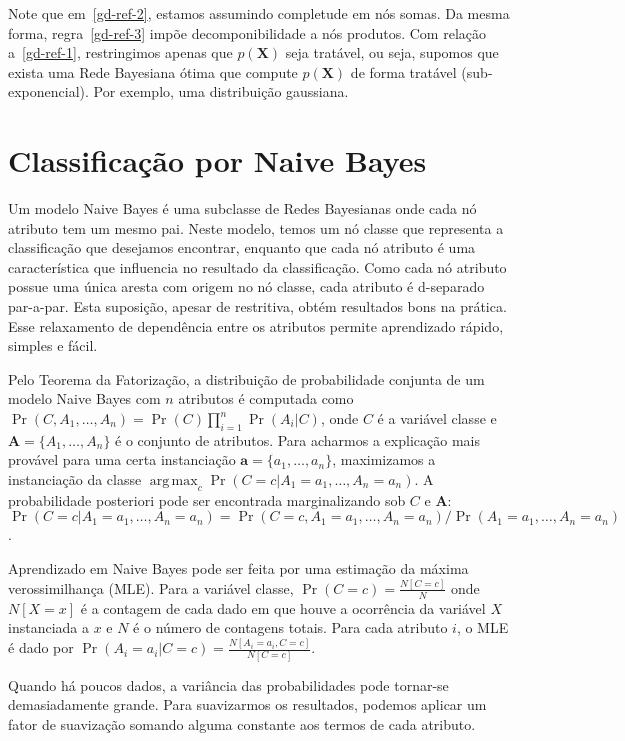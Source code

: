 \documentclass{amsart}
\DeclareMathOperator*{\argmax}{arg\,max}
\theoremstyle{plain}
\numberwithin{equation}{section}
\newcommand{\set}[1]{\mathbf{#1}}
\begin{document}
Note que em~\ref{gd-ref-2}, estamos assumindo completude em nós somas. Da mesma forma,
regra~\ref{gd-ref-3} impõe decomponibilidade a nós produtos. Com relação a~\ref{gd-ref-1},
restringimos apenas que $p(\set{X})$ seja tratável, ou seja, supomos que exista uma Rede Bayesiana
ótima que compute $p(\set{X})$ de forma tratável (sub-exponencial). Por exemplo, uma distribuição
gaussiana.

\section{Classificação por Naive Bayes}

Um modelo Naive Bayes é uma subclasse de Redes Bayesianas onde cada nó atributo tem um mesmo pai.
Neste modelo, temos um nó classe que representa a classificação que desejamos encontrar, enquanto
que cada nó atributo é uma característica que influencia no resultado da classificação. Como cada
nó atributo possue uma única aresta com origem no nó classe, cada atributo é d-separado par-a-par.
Esta suposição, apesar de restritiva, obtém resultados bons na prática. Esse relaxamento de
dependência entre os atributos permite aprendizado rápido, simples e fácil.

Pelo Teorema da Fatorização, a distribuição de probabilidade conjunta de um modelo Naive Bayes com
$n$ atributos é computada como $\Pr(C,A_1,\ldots,A_n)=\Pr(C)\prod_{i=1}^n \Pr(A_i|C)$, onde $C$ é
a variável classe e $\set{A}=\{A_1,\ldots,A_n\}$ é o conjunto de atributos. Para acharmos a
explicação mais provável para uma certa instanciação $\set{a}=\{a_1,\ldots,a_n\}$, maximizamos a
instanciação da classe $\argmax_c \Pr(C=c|A_1=a_1,\ldots,A_n=a_n)$. A probabilidade posteriori
pode ser encontrada marginalizando sob $C$ e $\set{A}$: $\Pr(C=c|A_1=a_1,\ldots,A_n=a_n)=\Pr(C=c,
A_1=a_1,\ldots,A_n=a_n)/\Pr(A_1=a_1,\ldots,A_n=a_n)$.

Aprendizado em Naive Bayes pode ser feita por uma estimação da máxima verossimilhança (MLE). Para a
variável classe, $\Pr(C=c)=\frac{N[C=c]}{N}$ onde $N[X=x]$ é a contagem de cada dado em que houve
a ocorrência da variável $X$ instanciada a $x$ e $N$ é o número de contagens totais. Para cada
atributo $i$, o MLE é dado por $\Pr(A_i=a_i|C=c)=\frac{N[A_i=a_i,C=c]}{N[C=c]}$.

Quando há poucos dados, a variância das probabilidades pode tornar-se demasiadamente grande. Para
suavizarmos os resultados, podemos aplicar um fator de suavização somando alguma constante aos
termos de cada atributo.
\end{document}
